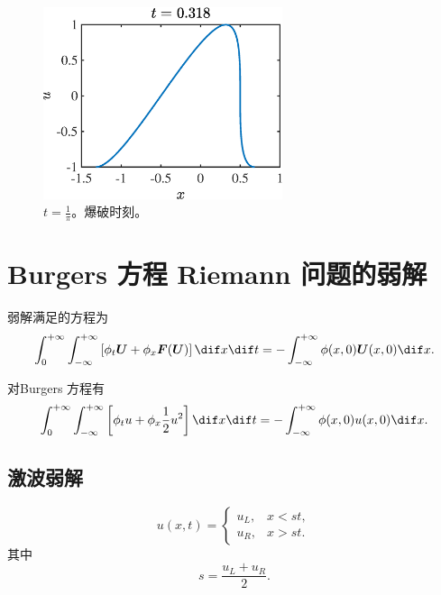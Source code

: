 \documentclass[12pt]{article}
\begin{document}
\begin{figure}[htp]
	\centering
	\includegraphics[width=7cm]{1.eps}
	\caption{$t=\frac{1}{\pi}$。爆破时刻。}
	\label{fig:1}
\end{figure}

\section{Burgers 方程 Riemann 问题的弱解}

弱解满足的方程为
\begin{equation}
	\int_{0}^{+\infty} \int_{-\infty}^{+\infty}\left[\phi_{t} \boldsymbol{U}+\phi_{x} \boldsymbol{F}(\boldsymbol{U})\right] \dif x \dif t=-\int_{-\infty}^{+\infty} \phi(x, 0) \boldsymbol{U}(x, 0) \dif x.
\end{equation}

对Burgers 方程有
\begin{equation}
	\int_{0}^{+\infty} \int_{-\infty}^{+\infty}\left[\phi_{t} {u}+\phi_{x} \frac{1}{2}u^2\right] \dif x \dif t=-\int_{-\infty}^{+\infty} \phi(x, 0) {u}(x, 0) \dif x.
\end{equation}

\subsection{激波弱解}


\begin{equation}
	u(x, t)=
	\begin{cases}
		u_{L}, & x<s t, \\
		u_{R}, & x>s t	.
	\end{cases}
\end{equation}
其中
\begin{equation}
	s=\frac{u_L+u_R}{2}.
\end{equation}
\end{document}
